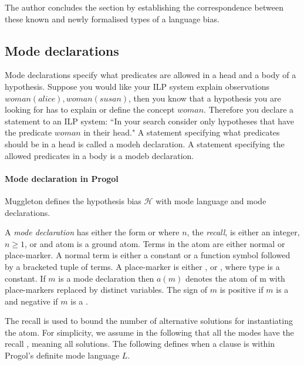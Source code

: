 The author concludes the section by establishing the correspondence between these known and newly formalised types of a language bias.

\subsection{Mode declarations}\label{background_mode_declarations}
Mode declarations specify what predicates are allowed in a head and a body of a hypothesis.
Suppose you would like your ILP system explain observations
$woman(alice), woman(susan)$, then you know that a hypothesis you are looking for has to explain or define the concept $woman$. Therefore you declare a statement to an ILP system: ``In your search consider only hypotheses that have the predicate $woman$ in their head." A statement specifying what predicates should be in a head is called a modeh declaration. A statement specifying the allowed predicates in a body is a modeb declaration.

\paragraph{Mode declaration in Progol}
Muggleton defines the hypothesis bias $\mathcal{H}$ with mode language and mode declarations.
\begin{defn}\cite{muggleton1995inverse}
A \emph{mode declaration} has either the form
 or  where $n$, the \emph{recall}, is either an integer, $n \ge 1$,
or \tc{*} and atom is a ground atom. Terms in the atom are either normal or place-marker. A normal term is either a constant or a function symbol followed by a
bracketed tuple of terms. A place-marker is either ,  or , where
type is a constant. If $m$ is a mode declaration then $a(m)$ denotes the atom of m
with place-markers replaced by distinct variables. The sign of $m$ is positive if $m$
is a  and negative if $m$ is a .
\end{defn}

The recall is used to bound the number of alternative solutions for instantiating
the atom. For simplicity, we assume in the following that all the modes have the
recall \tc{*}, meaning all solutions. The following defines when a clause is within Progol's definite mode language $L$.

